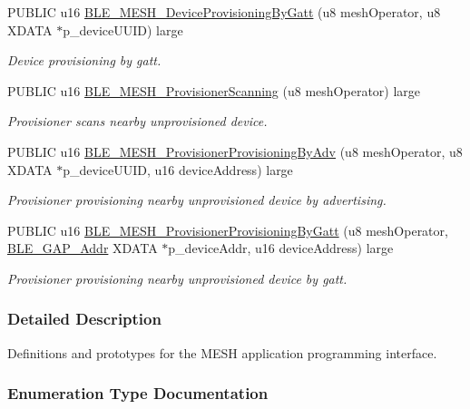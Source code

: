 \begin{DoxyCompactItemize}
P\+U\+B\+L\+IC u16 \hyperlink{group___m_e_s_h_ga2439336713adfe6966c8399c46c600e6}{B\+L\+E\+\_\+\+M\+E\+S\+H\+\_\+\+Device\+Provisioning\+By\+Gatt} (u8 mesh\+Operator, u8 X\+D\+A\+TA $\ast$p\+\_\+device\+U\+U\+ID) large
\begin{DoxyCompactList}\small\item\em Device provisioning by gatt. \end{DoxyCompactList}\item 
P\+U\+B\+L\+IC u16 \hyperlink{group___m_e_s_h_gab97f486b46a9747e043eb69017cba54d}{B\+L\+E\+\_\+\+M\+E\+S\+H\+\_\+\+Provisioner\+Scanning} (u8 mesh\+Operator) large
\begin{DoxyCompactList}\small\item\em Provisioner scans nearby unprovisioned device. \end{DoxyCompactList}\item 
P\+U\+B\+L\+IC u16 \hyperlink{group___m_e_s_h_ga031e766f9574e1ee0d5d0c5f3485ae2d}{B\+L\+E\+\_\+\+M\+E\+S\+H\+\_\+\+Provisioner\+Provisioning\+By\+Adv} (u8 mesh\+Operator, u8 X\+D\+A\+TA $\ast$p\+\_\+device\+U\+U\+ID, u16 device\+Address) large
\begin{DoxyCompactList}\small\item\em Provisioner provisioning nearby unprovisioned device by advertising. \end{DoxyCompactList}\item 
P\+U\+B\+L\+IC u16 \hyperlink{group___m_e_s_h_ga245a1f1b088111323d717869dd8dfee9}{B\+L\+E\+\_\+\+M\+E\+S\+H\+\_\+\+Provisioner\+Provisioning\+By\+Gatt} (u8 mesh\+Operator, \hyperlink{struct_b_l_e___g_a_p___addr}{B\+L\+E\+\_\+\+G\+A\+P\+\_\+\+Addr} X\+D\+A\+TA $\ast$p\+\_\+device\+Addr, u16 device\+Address) large
\begin{DoxyCompactList}\small\item\em Provisioner provisioning nearby unprovisioned device by gatt. \end{DoxyCompactList}\end{DoxyCompactItemize}


\subsubsection{Detailed Description}
Definitions and prototypes for the M\+E\+SH application programming interface. 



\subsubsection{Enumeration Type Documentation}
